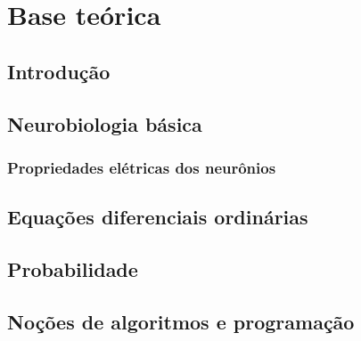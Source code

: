 \chapter{Base teórica}\label{cap:teoria}
\section{Introdução}\label{sec:teoria_intro}

\section{Neurobiologia básica}\label{sec:fisiologia}
\subsection{Propriedades elétricas dos neurônios}

\section{Equações diferenciais ordinárias}\label{sec:eqdif}

\section{Probabilidade}\label{sec:probabilidade}

\section{Noções de algoritmos e programação}\label{sec:algoritmo}
